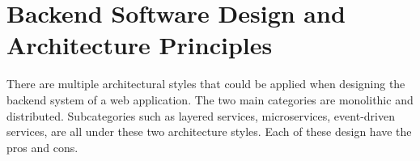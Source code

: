 \section[Backend Software Design and Architecture Principles]{Backend Software Design and Architecture Principles}\label{sec:newsec}

There are multiple architectural styles that could be applied when designing the backend system of a web application.
The two main categories are monolithic and distributed. Subcategories such as layered services, microservices, event-driven services, are all under 
these two architecture styles. Each of these design have the pros and cons.




